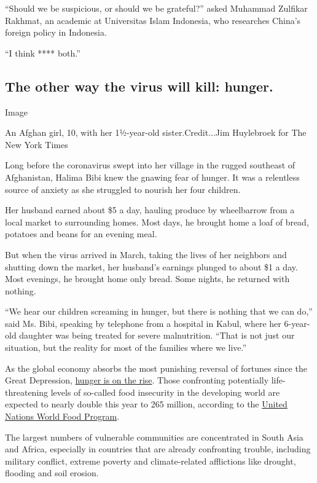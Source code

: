 ``Should we be suspicious, or should we be grateful?'' asked Muhammad
Zulfikar Rakhmat, an academic at Universitas Islam Indonesia, who
researches China's foreign policy in Indonesia.

``I think **** both.''

\hypertarget{the-other-way-the-virus-will-kill-hunger}{%
\subsection{The other way the virus will kill:
hunger.}\label{the-other-way-the-virus-will-kill-hunger}}

Image

An Afghan girl, 10, with her 1½-year-old sister.Credit...Jim Huylebroek
for The New York Times

Long before the coronavirus swept into her village in the rugged
southeast of Afghanistan, Halima Bibi knew the gnawing fear of hunger.
It was a relentless source of anxiety as she struggled to nourish her
four children.

Her husband earned about \$5 a day, hauling produce by wheelbarrow from
a local market to surrounding homes. Most days, he brought home a loaf
of bread, potatoes and beans for an evening meal.

But when the virus arrived in March, taking the lives of her neighbors
and shutting down the market, her husband's earnings plunged to about
\$1 a day. Most evenings, he brought home only bread. Some nights, he
returned with nothing.

``We hear our children screaming in hunger, but there is nothing that we
can do,'' said Ms. Bibi, speaking by telephone from a hospital in Kabul,
where her 6-year-old daughter was being treated for severe malnutrition.
``That is not just our situation, but the reality for most of the
families where we live.''

As the global economy absorbs the most punishing reversal of fortunes
since the Great Depression,
\href{https://www.nytimes3xbfgragh.onion/2020/09/11/business/covid-hunger-food-insecurity.html}{hunger
is on the rise}. Those confronting potentially life-threatening levels
of so-called food insecurity in the developing world are expected to
nearly double this year to 265 million, according to the
\href{https://www.wfp.org/news/covid-19-will-double-number-people-facing-food-crises-unless-swift-action-taken}{United
Nations World Food Program}.

The largest numbers of vulnerable communities are concentrated in South
Asia and Africa, especially in countries that are already confronting
trouble, including military conflict, extreme poverty and
climate-related afflictions like drought, flooding and soil erosion.


